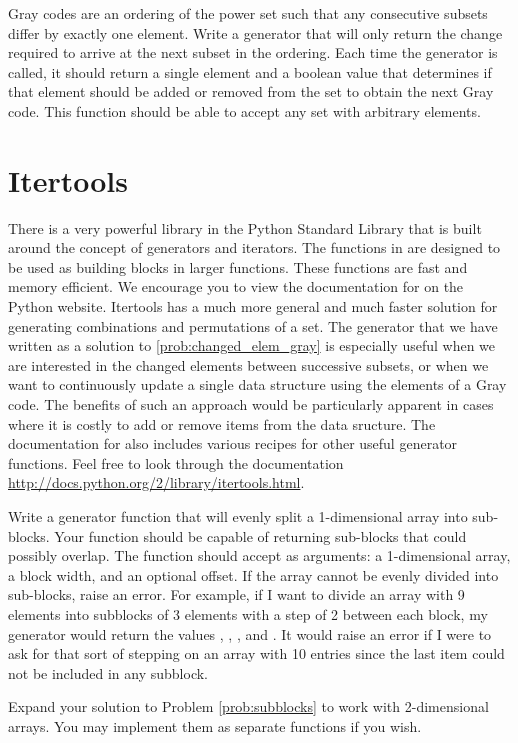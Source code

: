 \begin{problem}
\label{prob:changed_elem_gray}
Gray codes are an ordering of the power set such that any consecutive subsets differ by exactly one element.  Write a generator that will only return the change required to arrive at the next subset in the ordering.  Each time the generator is called, 
it should return a single element and a boolean value that determines if that element should be
added or removed from the set to obtain the next Gray code.  This function should be able to accept any set with arbitrary elements.
\end{problem}

\section*{Itertools}
There is a very powerful library in the Python Standard Library that is built around the concept
of generators and iterators.  The functions in  are designed to be used as
building blocks in larger functions.  These functions are fast and memory efficient.
We encourage you to view the documentation for  on the Python website.  Itertools has a much more general and much faster solution for generating combinations and permutations of a set.
The generator that we have written as a solution to \ref{prob:changed_elem_gray} is especially useful when we are interested in the changed elements between successive subsets, or when we want to continuously update a single data structure using the elements of a Gray code.
The benefits of such an approach would be particularly apparent in cases where it is costly to add or remove items from the data sructure.
The documentation for  also includes various recipes for other useful generator functions.
Feel free to look through the documentation \url{http://docs.python.org/2/library/itertools.html}.

\begin{problem}
\label{prob:subblocks}
Write a generator function that will evenly split a 1-dimensional array into sub-blocks.
Your function should be capable of returning sub-blocks that could possibly overlap.
The function should accept as arguments: a 1-dimensional array, a block width, and an optional offset.
If the array cannot be evenly divided into sub-blocks, raise an error.
For example, if I want to divide an array with 9 elements into subblocks of 3 elements with a step of 2 between each block, my generator would return the values , , , and .
It would raise an error if I were to ask for that sort of stepping on an array with 10 entries since the last item could not be included in any subblock.
\end{problem}

\begin{problem}
Expand your solution to Problem \ref{prob:subblocks} to work with 2-dimensional
arrays.  You may implement them as separate functions if you wish.
\end{problem}
